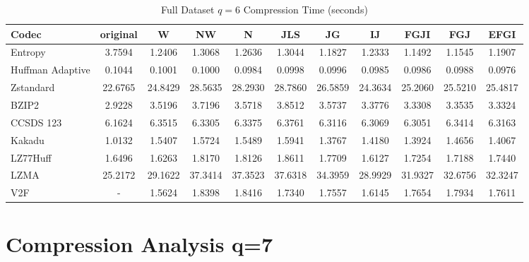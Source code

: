 \documentclass{article}
\begin{document}
\begin{table}[h!]
\centering
\caption{Full Dataset $q=6$ Compression Time (seconds)}
\begin{tabular}{|l|cccccccccc|}
\hline
Codec &  original &       W &      NW &       N &     JLS &      JG &      IJ &    FGJI &     FGJ &    EFGI \\
\hline
Entropy & 3.7594 & 1.2406 & 1.3068 & 1.2636 & 1.3044 & 1.1827 & 1.2333 & 1.1492 & 1.1545 & 1.1907         \\
\hline
Huffman Adaptive &    0.1044 &  0.1001 &  0.1000 &  0.0984 &  0.0998 &  0.0996 &  0.0985 &  0.0986 &  0.0988 &  0.0976 \\
Zstandard        &   22.6765 & 24.8429 & 28.5635 & 28.2930 & 28.7860 & 26.5859 & 24.3634 & 25.2060 & 25.5210 & 25.4817 \\
BZIP2            &    2.9228 &  3.5196 &  3.7196 &  3.5718 &  3.8512 &  3.5737 &  3.3776 &  3.3308 &  3.3535 &  3.3324 \\
CCSDS 123        &    6.1624 &  6.3515 &  6.3305 &  6.3375 &  6.3761 &  6.3116 &  6.3069 &  6.3051 &  6.3414 &  6.3163 \\
Kakadu           &    1.0132 &  1.5407 &  1.5724 &  1.5489 &  1.5941 &  1.3767 &  1.4180 &  1.3924 &  1.4656 &  1.4067 \\
LZ77Huff         &    1.6496 &  1.6263 &  1.8170 &  1.8126 &  1.8611 &  1.7709 &  1.6127 &  1.7254 &  1.7188 &  1.7440 \\
LZMA             &   25.2172 & 29.1622 & 37.3414 & 37.3523 & 37.6318 & 34.3959 & 28.9929 & 31.9327 & 32.6756 & 32.3247 \\
V2F              &    - &  1.5624 &  1.8398 &  1.8416 &  1.7340 &  1.7557 &  1.6145 &  1.7654 &  1.7934 &  1.7611 \\
\hline
\end{tabular}
\end{table}

\newpage
\section{Compression Analysis q=7}
\end{document}
